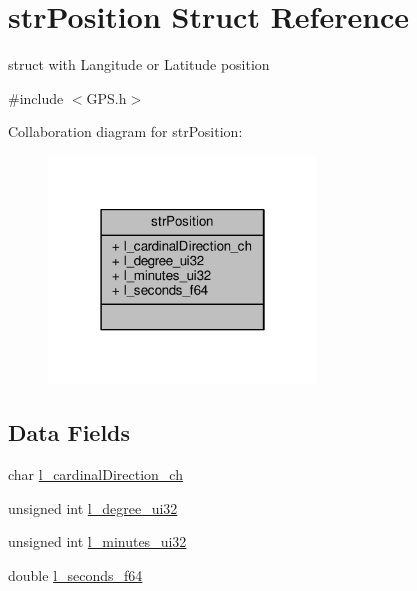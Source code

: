 \hypertarget{structstrPosition}{\section{str\+Position Struct Reference}
\label{structstrPosition}
}


struct with Langitude or Latitude position  




{\ttfamily \#include $<$G\+P\+S.\+h$>$}



Collaboration diagram for str\+Position\+:
\nopagebreak
\begin{figure}[H]
\begin{center}
\leavevmode
\includegraphics[width=202pt]{structstrPosition__coll__graph}
\end{center}
\end{figure}
\subsection*{Data Fields}
\begin{DoxyCompactItemize}
\item 
char \hyperlink{structstrPosition_aa39fed1d421cb2260d0ef7157c3c00d0_aa39fed1d421cb2260d0ef7157c3c00d0}{l\+\_\+cardinal\+Direction\+\_\+ch}
\item 
unsigned int \hyperlink{structstrPosition_ac060af7d7963812c116c24cdb861f184_ac060af7d7963812c116c24cdb861f184}{l\+\_\+degree\+\_\+ui32}
\item 
unsigned int \hyperlink{structstrPosition_a5489ef5e7f8e6ee45990b262c80a7819_a5489ef5e7f8e6ee45990b262c80a7819}{l\+\_\+minutes\+\_\+ui32}
\item 
double \hyperlink{structstrPosition_ae62d246c481c611e168ea86b70d5313b_ae62d246c481c611e168ea86b70d5313b}{l\+\_\+seconds\+\_\+f64}
\end{DoxyCompactItemize}


